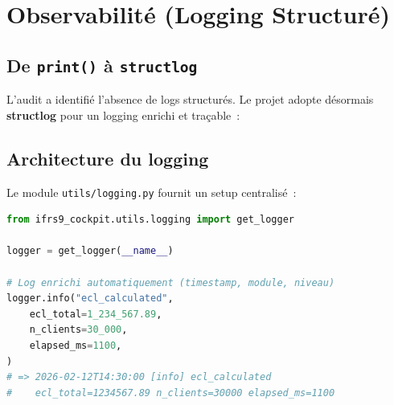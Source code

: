\documentclass[12pt,a4paper]{article}
\begin{document}
\section{Observabilit\'e (Logging Structur\'e)}
\label{sec:logging}

\subsection{De \texttt{print()} \`a \texttt{structlog}}

L'audit a identifi\'e l'absence de logs structur\'es. Le projet adopte d\'esormais \textbf{structlog} pour un logging enrichi et tra\c{c}able~:

\begin{center}
\end{center}

\subsection{Architecture du logging}

Le module \texttt{utils/logging.py} fournit un setup centralis\'e~:

\begin{formulebox}
\begin{lstlisting}[language=Python]
from ifrs9_cockpit.utils.logging import get_logger

logger = get_logger(__name__)

# Log enrichi automatiquement (timestamp, module, niveau)
logger.info("ecl_calculated",
    ecl_total=1_234_567.89,
    n_clients=30_000,
    elapsed_ms=1100,
)
# => 2026-02-12T14:30:00 [info] ecl_calculated
#    ecl_total=1234567.89 n_clients=30000 elapsed_ms=1100
\end{lstlisting}
\end{formulebox}
\end{document}
